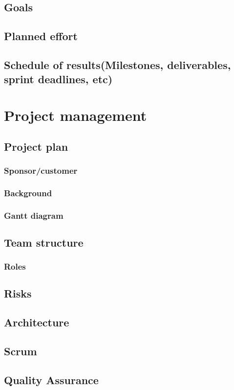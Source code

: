 \documentclass[10pt,a4paper,oneside]{report}
\begin{document}
\section{Goals}
\section{Planned effort}
\section{Schedule of results(Milestones, deliverables, sprint deadlines, etc)}


\chapter{Project management}
\section{Project plan}
\subsection{Sponsor/customer}
\subsection{Background}
\subsection{Gantt diagram}
\section{Team structure}
\subsection{Roles}
\section{Risks}
\section{Architecture}
\section{Scrum}
\section{Quality Assurance}
\end{document}
